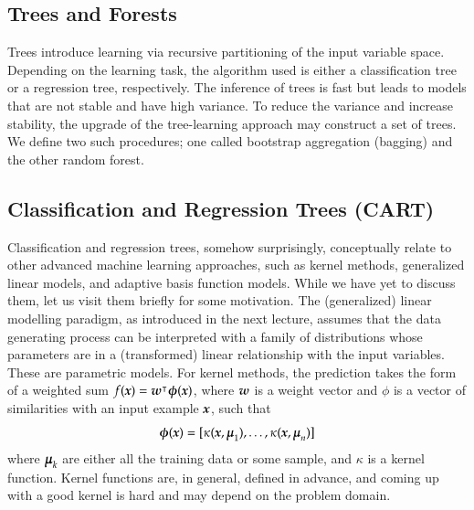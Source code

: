 \begin{refsection}
\chapter{Trees and Forests}

\begin{summary}
Trees introduce learning via recursive partitioning of the input variable space. Depending on the learning task, the algorithm used is either a classification tree or a regression tree, respectively. The inference of trees is fast but leads to models that are not stable and have high variance. To reduce the variance and increase stability, the upgrade of the tree-learning approach may construct a set of trees. We define two such procedures; one called bootstrap aggregation (bagging) and the other random forest.
\end{summary}

\section{Classification and Regression Trees (CART)}

Classification and regression trees, somehow surprisingly, conceptually relate to other advanced machine learning approaches, such as kernel methods, generalized linear models, and adaptive basis function models. While we have yet to discuss them, let us visit them briefly for some motivation. The (generalized) linear modelling paradigm, as introduced in the next lecture, assumes that the data generating process can be interpreted with a family of distributions whose parameters are in a (transformed) linear relationship with the input variables. These are parametric models. For kernel methods, the prediction takes the form of a weighted sum $f(\boldsymbol{x})=\boldsymbol{w}^\intercal\boldsymbol{\phi}(\boldsymbol{x})$, where $\boldsymbol{w}$ is a weight vector and $\phi$ is a vector of similarities with an input example $\boldsymbol{x}$, such that
$$ \boldsymbol{\phi}(\boldsymbol{x}) = [\kappa(\boldsymbol{x},\boldsymbol{\mu}_1), \ldots, \kappa(\boldsymbol{x},\boldsymbol{\mu}_n)] $$
where $\boldsymbol{\mu}_k$ are either all the training data or some sample, and $\kappa$ is a kernel function. Kernel functions are, in general, defined in advance, and coming up with a good kernel is hard and may depend on the problem domain.


\end{refsection}
